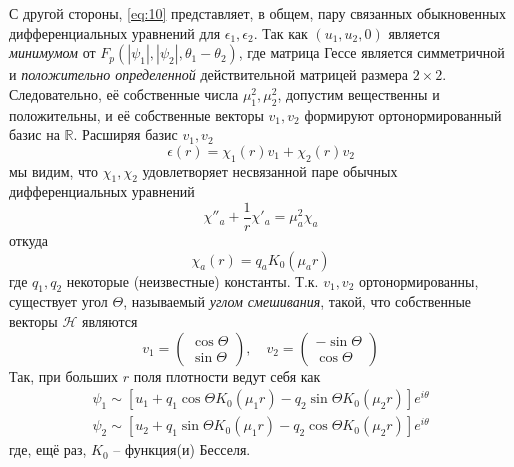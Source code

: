 С другой стороны, \eqref{eq:10} представляет, в общем, пару связанных 
обыкновенных дифференциальных уравнений для \( \epsilon_1, \epsilon_2 \). Так 
как \( (u_1, u_2, 0 ) \) является \textit{минимумом} от 
\( F_p(|\psi_1|, |\psi_2|, \theta_1 - \theta_2) \), где матрица Гессе является  
симметричной и \textit{положительно определенной} действительной матрицей 
размера \( 2\times2 \). Следовательно, её собственные числа 
\( \mu_1^2, \mu_2^2\), допустим вещественны и положительны, и её собственные 
векторы \( v_1, v_2 \) формируют ортонормированный базис на \( \mathbb{R} \). 
Расширяя базис \( v_1, v_2 \)
\begin{equation}
    \epsilon(r) = \chi_1(r) v_1 + \chi_2(r) v_2
    \label{eq:17}
\end{equation}
мы видим, что \( \chi_1, \chi_2 \) удовлетворяет несвязанной паре обычных 
дифференциальных уравнений
\begin{equation}
    \chi''_a + \frac{1}{r}\chi'_a = \mu_a^2 \chi_a
    \label{eq:18}
\end{equation}
откуда
\begin{equation}
    \chi_a(r) = q_a K_0(\mu_a r)
    \label{eq:19}
\end{equation}
где \( q_1, q_2 \) некоторые (неизвестные) константы. Т.к. \( v_1, v_2 \) 
ортонормированны, существует угол \( \Theta \), называемый 
\textit{углом смешивания}, такой, что собственные векторы \( \mathcal{H} \) 
являются
\begin{equation}
    v_1 = \left( \begin{array}{c}
        \cos\Theta \\
        \sin\Theta
    \end{array} \right), \quad
    v_2 = \left( \begin{array}{c}
        -\sin\Theta \\
        \cos\Theta
    \end{array} \right)
    \label{eq:20}
\end{equation}
Так, при больших \( r \) поля плотности ведут себя как 
\begin{gather}
    \psi_1 \sim \left[ u_1 + q_1\cos\Theta K_0(\mu_1 r) - 
        q_2\sin\Theta K_0(\mu_2 r) \right]e^{i\theta} \nonumber \\
    \psi_2 \sim \left[ u_2 + q_1\sin\Theta K_0(\mu_1 r) - 
        q_2\cos\Theta K_0(\mu_2 r) \right]e^{i\theta}
    \label{eq:21}
\end{gather}
где, ещё раз, \( K_0 \) -- функция(и) Бесселя.

